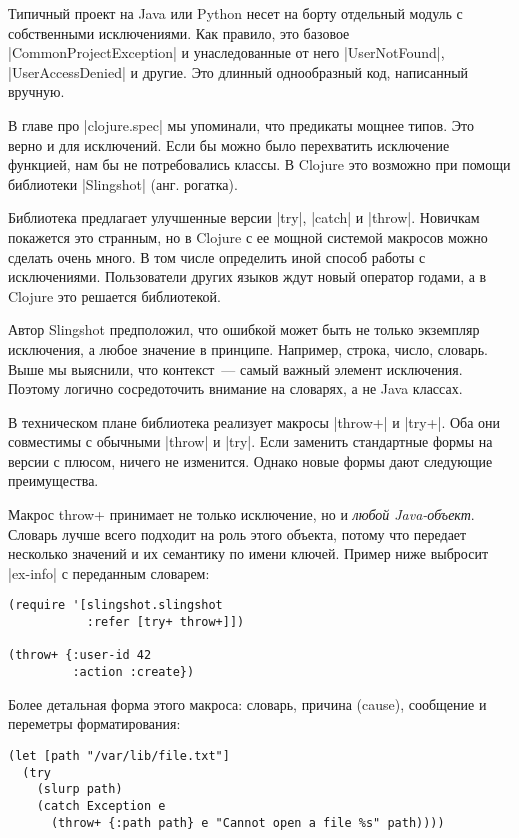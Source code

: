 Типичный проект на Java или Python несет на борту отдельный модуль с
собственными исключениями. Как правило, это базовое \spverb|CommonProjectException| и
унаследованные от него \spverb|UserNotFound|, \spverb|UserAccessDenied| и другие. Это длинный
однообразный код, написанный вручную.

В главе про \spverb|clojure.spec| мы упоминали, что предикаты мощнее типов. Это верно и
для исключений. Если бы можно было перехватить исключение функцией, нам бы не
потребовались классы. В Clojure это возможно при помощи библиотеки \spverb|Slingshot|
(анг. рогатка).

Библиотека предлагает улучшенные версии \spverb|try|, \spverb|catch| и \spverb|throw|. Новичкам
покажется это странным, но в Clojure с ее мощной системой макросов можно сделать
очень много. В том числе определить иной способ работы с исключениями.
Пользователи других языков ждут новый оператор годами, а в Clojure это решается
библиотекой.

Автор Slingshot предположил, что ошибкой может быть не только экземпляр
исключения, а любое значение в принципе. Например, строка, число, словарь. Выше
мы выяснили, что контекст~--- самый важный элемент исключения. Поэтому логично
сосредоточить внимание на словарях, а не Java классах.

В техническом плане библиотека реализует макросы \spverb|throw+| и \spverb|try+|. Оба они
совместимы с обычными \spverb|throw| и \spverb|try|. Если заменить стандартные формы на версии
с плюсом, ничего не изменится. Однако новые формы дают следующие преимущества.

Макрос throw+ принимает не только исключение, но и \emph{любой
Java-объект}. Словарь лучше всего подходит на роль этого объекта, потому что
передает несколько значений и их семантику по имени ключей. Пример ниже выбросит
\spverb|ex-info| с переданным словарем:

\begin{verbatim}
(require '[slingshot.slingshot
           :refer [try+ throw+]])

(throw+ {:user-id 42
         :action :create})
\end{verbatim}

Более детальная форма этого макроса: словарь, причина (cause), сообщение и
переметры форматирования:

\begin{verbatim}
(let [path "/var/lib/file.txt"]
  (try
    (slurp path)
    (catch Exception e
      (throw+ {:path path} e "Cannot open a file %s" path))))
\end{verbatim}

